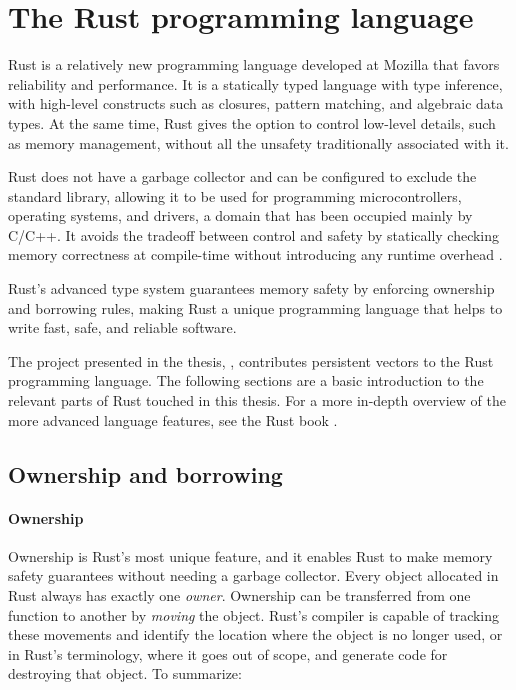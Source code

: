 \section{The Rust programming language}
\label{sec:rust}

Rust is a relatively new programming language developed at Mozilla that favors reliability and performance. It is a statically typed language with type inference, with high-level constructs such as closures, pattern matching, and algebraic data types. At the same time, Rust gives the option to control low-level details, such as memory management, without all the unsafety traditionally associated with it.

Rust does not have a garbage collector and can be configured to exclude the standard library, allowing it to be used for programming microcontrollers, operating systems, and drivers, a domain that has been occupied mainly by C/C++. It avoids the tradeoff between control and safety by statically checking memory correctness at compile-time without introducing any runtime overhead \cite{reed-patina}.

Rust's advanced type system guarantees memory safety by enforcing ownership and borrowing rules, making Rust a unique programming language that helps to write fast, safe, and reliable software.

The project presented in the thesis, \pvecrs{}, contributes persistent vectors to the Rust programming language. The following sections are a basic introduction to the relevant parts of Rust touched in this thesis. For a more in-depth overview of the more advanced language features, see the Rust book \cite{rust-book-2e}.

\subsection{Ownership and borrowing}

\paragraph{Ownership}
Ownership is Rust's most unique feature, and it enables Rust to make memory safety guarantees without needing a garbage collector. Every object allocated in Rust always has exactly one \emph{owner}. Ownership can be transferred from one function to another by \emph{moving} the object. Rust's compiler is capable of tracking these movements and identify the location where the object is no longer used, or in Rust's terminology, where it goes out of scope, and generate code for destroying that object. To summarize:

